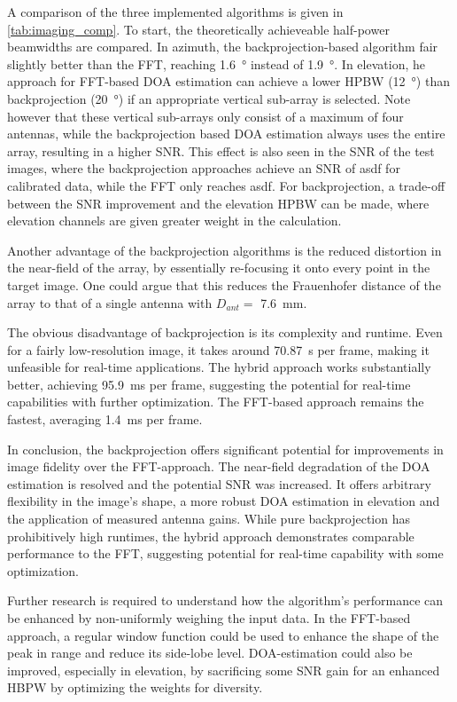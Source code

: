 A comparison of the three implemented algorithms is given in \cref{tab:imaging_comp}.
To start, the theoretically achieveable half-power beamwidths are compared.
In azimuth, the backprojection-based algorithm fair slightly better than the FFT, reaching \SI{1.6}{\degree} instead of \SI{1.9}{\degree}.
In elevation, he approach for FFT-based DOA estimation can achieve a lower HPBW (\SI{12}{\degree}) than backprojection (\SI{20}{\degree})
if an appropriate vertical sub-array is selected.
Note however that these vertical sub-arrays only consist of a maximum of four antennas,
while the backprojection based DOA estimation always uses the entire array, resulting in a higher SNR.
This effect is also seen in the SNR of the test images,
where the backprojection approaches achieve an SNR of asdf for calibrated data,
while the FFT only reaches asdf.
For backprojection, a trade-off between the SNR improvement and the elevation HPBW can be made,
where elevation channels are given greater weight in the calculation.

Another advantage of the backprojection algorithms is the reduced distortion in the near-field of the array,
by essentially re-focusing it onto every point in the target image.
One could argue that this reduces the Frauenhofer distance of the array to that of a single antenna with
$D_{ant}=$ \SI{7.6}{\mm}.

The obvious disadvantage of backprojection is its complexity and runtime.
Even for a fairly low-resolution image, it takes around \SI{70.87}{\s} per frame,
making it unfeasible for real-time applications.
The hybrid approach works substantially better, achieving \SI{95.9}{\ms} per frame,
suggesting the potential for real-time capabilities with further optimization.
The FFT-based approach remains the fastest, averaging \SI{1.4}{\ms} per frame.


In conclusion, the backprojection offers significant potential for improvements in image fidelity over the FFT-approach.
The near-field degradation of the DOA estimation is resolved and the potential SNR was increased.
It offers arbitrary flexibility in the image's shape,
a more robust DOA estimation in elevation and the application of measured antenna gains.
While pure backprojection has prohibitively high runtimes,
the hybrid approach demonstrates comparable performance to the FFT,
suggesting potential for real-time capability with some optimization.

Further research is required to understand how the algorithm's performance can be enhanced
by non-uniformly weighing the input data. In the FFT-based approach,
a regular window function could be used to enhance the shape of the peak in range and reduce its side-lobe level.
DOA-estimation could also be improved, especially in elevation,
by sacrificing some SNR gain for an enhanced HBPW by optimizing the weights for diversity.
